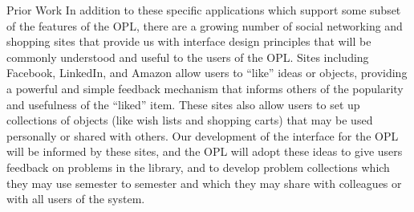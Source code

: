 \documentclass[11pt]{article}
\begin{document}
\begin{section}{Prior Work}
In addition to these specific applications which support some subset of
the features of the OPL, there are a growing number of social networking
and shopping sites that provide us with interface design principles that
will be commonly understood and useful to the users of the OPL.  Sites
including Facebook, LinkedIn, and Amazon allow users to ``like'' ideas or
objects, providing a powerful and simple feedback mechanism that informs
others of the popularity and usefulness of the ``liked'' item.  These
sites also allow users to set up collections of objects (like wish lists
and shopping carts) that may be used personally or shared with others.
Our development of the interface for the OPL will be informed by these
sites, and the OPL will adopt these ideas to give users feedback on
problems in the library, and to develop problem collections which they may
use semester to semester and which they may share with colleagues or with
all users of the system.


\end{section}
\end{document}
